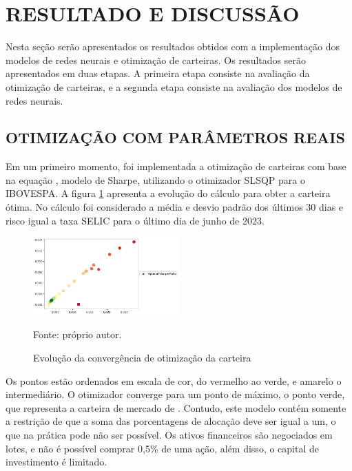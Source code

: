\section{RESULTADO E DISCUSSÃO}

    \ipar Nesta seção serão apresentados os resultados obtidos com a implementação dos modelos de redes neurais e otimização de carteiras. Os resultados serão apresentados em duas etapas. A primeira etapa consiste na avaliação da otimização de carteiras, e a segunda etapa consiste na avaliação dos modelos de redes neurais.

    \subsection{OTIMIZAÇÃO COM PARÂMETROS REAIS}

        \ipar Em um primeiro momento, foi implementada a otimização de carteiras com base na equação , modelo de Sharpe, utilizando o otimizador \acrshort{SLSQP} para o \acrshort{IBOVESPA}. A figura \ref{fig:otimizacao_ibov} apresenta a evolução do cálculo para obter a carteira ótima. No cálculo foi considerado a média e desvio padrão dos últimos 30 dias e risco igual a taxa SELIC para o último dia de junho de 2023.

        \begin{figure}[H]
            \centering
            \caption{Evolução da convergência de otimização da carteira}
            \label{fig:otimizacao_ibov}
            \includegraphics[width=0.5\textwidth]{./imagens/otimizacao_ibov.png}
            \par \footnotesize Fonte: próprio autor.
        \end{figure}

        \ipar Os pontos estão ordenados em escala de cor, do vermelho ao verde, e amarelo o intermediário. O otimizador converge para um ponto de máximo, o ponto verde, que representa a carteira de mercado de . Contudo, este modelo contém somente a restrição de que a soma das porcentagens de alocação deve ser igual a um, o que na prática pode não ser possível. Os ativos financeiros são negociados em lotes, e não é possível comprar 0,5\% de uma ação, além disso, o capital de investimento é limitado. 

